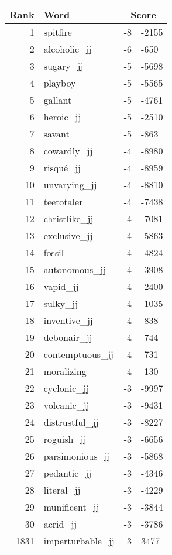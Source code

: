 \begin{longtable}[!htbp]{| rlr@{.}l |}
    \hline
    \textbf{Rank} & \textbf{Word} & \multicolumn{2}{c|}{\textbf{Score}} \\
    \hline
    \endhead
    1 & spitfire & -8 & -2155 \\
    2 & alcoholic\_jj & -6 & -650 \\
    3 & sugary\_jj & -5 & -5698 \\
    4 & playboy & -5 & -5565 \\
    5 & gallant & -5 & -4761 \\
    6 & heroic\_jj & -5 & -2510 \\
    7 & savant & -5 & -863 \\
    8 & cowardly\_jj & -4 & -8980 \\
    9 & risqué\_jj & -4 & -8959 \\
    10 & unvarying\_jj & -4 & -8810 \\
    11 & teetotaler & -4 & -7438 \\
    12 & christlike\_jj & -4 & -7081 \\
    13 & exclusive\_jj & -4 & -5863 \\
    14 & fossil & -4 & -4824 \\
    15 & autonomous\_jj & -4 & -3908 \\
    16 & vapid\_jj & -4 & -2400 \\
    17 & sulky\_jj & -4 & -1035 \\
    18 & inventive\_jj & -4 & -838 \\
    19 & debonair\_jj & -4 & -744 \\
    20 & contemptuous\_jj & -4 & -731 \\
    21 & moralizing & -4 & -130 \\
    22 & cyclonic\_jj & -3 & -9997 \\
    23 & volcanic\_jj & -3 & -9431 \\
    24 & distrustful\_jj & -3 & -8227 \\
    25 & roguish\_jj & -3 & -6656 \\
    26 & parsimonious\_jj & -3 & -5868 \\
    27 & pedantic\_jj & -3 & -4346 \\
    28 & literal\_jj & -3 & -4229 \\
    29 & munificent\_jj & -3 & -3844 \\
    30 & acrid\_jj & -3 & -3786 \\
    1831 & imperturbable\_jj & 3 & 3477 \\

\end{longtable}
